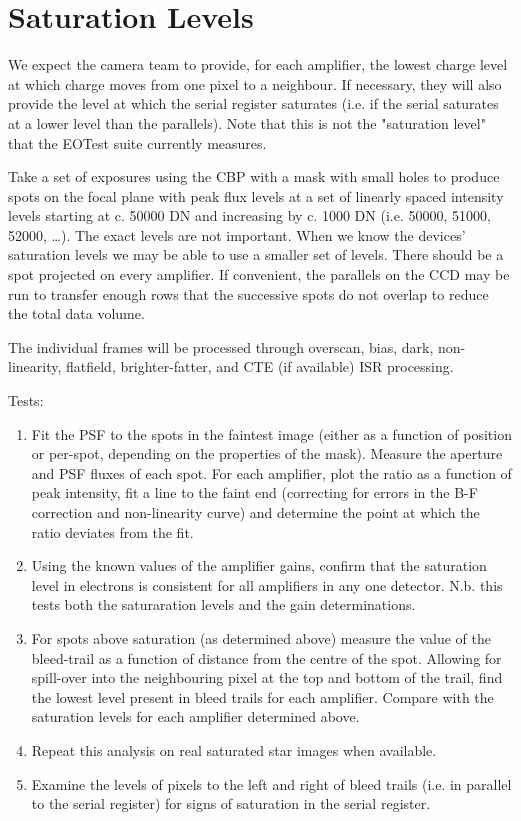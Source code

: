 \documentclass[DM,authoryear,toc,lsstdraft]{lsstdoc}
\begin{document}
\section{Saturation Levels}

We expect the camera team to provide, for each amplifier, the lowest charge level at which charge moves from
one pixel to a neighbour.  If necessary, they will also provide the level at which the serial register
saturates (i.e. if the serial saturates at a lower level than the parallels). Note that this is not
the "saturation level" that the EOTest suite currently measures.

Take a set of exposures using the CBP with a mask with small holes to produce spots on the focal plane with
peak flux levels at a set of linearly spaced intensity levels starting at c. 50000 DN and increasing by
c. 1000 DN (i.e. 50000, 51000, 52000, \ldots{}). The exact levels are not important. When we know the devices'
saturation levels we may be able to use a smaller set of levels.  There should be a spot projected on every
amplifier.  If convenient, the parallels on the CCD may be run to transfer enough rows that the successive
spots do not overlap to reduce the total data volume.

The individual frames will be processed through overscan, bias, dark, non-linearity, flatfield,
brighter-fatter, and CTE (if available) ISR processing.

Tests:
\begin{enumerate}
\item Fit the PSF to the spots in the faintest image (either as a function of position or per-spot, depending on
the properties of the mask).  Measure the aperture and PSF fluxes of each spot. For each amplifier, plot
the ratio as a function of peak intensity, fit a line to the faint end (correcting for errors in the B-F
correction and non-linearity curve) and determine the point at which the ratio deviates from the fit.
\item Using the known values of the amplifier gains, confirm that the saturation level in electrons is consistent
for all amplifiers in any one detector.  N.b. this tests both the saturaration levels and the gain
determinations.
\item For spots above saturation (as determined above) measure the value of the bleed-trail as a function of
distance from the centre of the spot.  Allowing for spill-over into the neighbouring pixel at the top and
bottom of the trail, find the lowest level present in bleed trails for each amplifier.  Compare with
the saturation levels for each amplifier determined above.
\item Repeat this analysis on real saturated star images when available.
\item Examine the levels of pixels to the left and right of bleed trails (i.e. in parallel to the serial
register) for signs of saturation in the serial register.
\end{enumerate}
\end{document}
